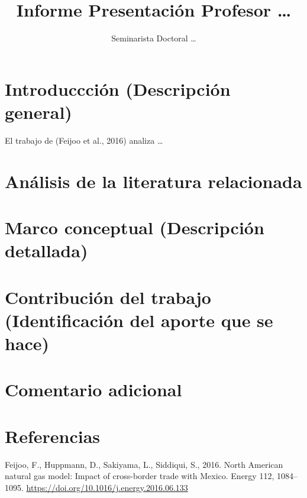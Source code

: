 \documentclass[]{article}
\title{Informe Presentación Profesor \ldots{}}
\author{Seminarista Doctoral \ldots{}}
\date{}
\begin{document}
\maketitle

\hypertarget{introducccion-descripcion-general}{%
\section{Introduccción (Descripción
general)}\label{introducccion-descripcion-general}}

El trabajo de (Feijoo et al., 2016) analiza \ldots{}

\hypertarget{analisis-de-la-literatura-relacionada}{%
\section{Análisis de la literatura
relacionada}\label{analisis-de-la-literatura-relacionada}}

\hypertarget{marco-conceptual-descripcion-detallada}{%
\section{Marco conceptual (Descripción
detallada)}\label{marco-conceptual-descripcion-detallada}}

\hypertarget{contribucion-del-trabajo-identificacion-del-aporte-que-se-hace}{%
\section{Contribución del trabajo (Identificación del aporte que se
hace)}\label{contribucion-del-trabajo-identificacion-del-aporte-que-se-hace}}

\hypertarget{comentario-adicional}{%
\section{Comentario adicional}\label{comentario-adicional}}

\hypertarget{referencias}{%
\section*{Referencias}\label{referencias}}

\hypertarget{refs}{}
\leavevmode\hypertarget{ref-feijoo_north_2016}{}%
Feijoo, F., Huppmann, D., Sakiyama, L., Siddiqui, S., 2016. North
American natural gas model: Impact of cross-border trade with Mexico.
Energy 112, 1084--1095.
\url{https://doi.org/10.1016/j.energy.2016.06.133}
\end{document}
